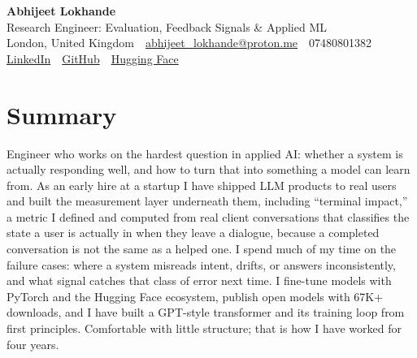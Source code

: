 \documentclass[10pt,a4paper]{article}
\newcommand{\sep}{\,\textcolor{accent!60}{\textbar}\,}
\begin{document}
\begin{center}
  {\fontsize{24}{26}\selectfont\bfseries Abhijeet Lokhande}\\[3pt]
  {\color{accent}\large Research Engineer: Evaluation, Feedback Signals \& Applied ML}\\[5pt]
  {\small
    London, United Kingdom \sep
    \href{mailto:abhijeet_lokhande@proton.me}{abhijeet\_lokhande@proton.me} \sep
    07480801382 \\[2pt]
    \href{https://www.linkedin.com/in/ablds/}{LinkedIn} \sep
    \href{https://github.com/abhijeetscode}{GitHub} \sep
    \href{https://huggingface.co/ab-ai}{Hugging Face}
  }
\end{center}
\vspace{2pt}

\section{Summary}
Engineer who works on the hardest question in applied AI: whether a system is actually responding well, and how to turn that into something a model can learn from. As an early hire at a startup I have shipped LLM products to real users and built the measurement layer underneath them, including ``terminal impact,'' a metric I defined and computed from real client conversations that classifies the state a user is actually in when they leave a dialogue, because a completed conversation is not the same as a helped one. I spend much of my time on the failure cases: where a system misreads intent, drifts, or answers inconsistently, and what signal catches that class of error next time. I fine-tune models with PyTorch and the Hugging Face ecosystem, publish open models with 67K+ downloads, and I have built a GPT-style transformer and its training loop from first principles. Comfortable with little structure; that is how I have worked for four years.

\end{document}
